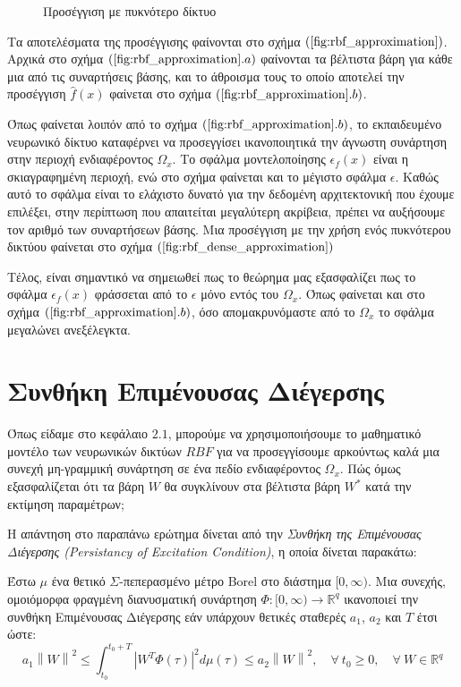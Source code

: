 {
\begin{wrapfigure}{r}{0.4\textwidth}
	\centering
	
	\caption{Προσέγγιση με πυκνότερο δίκτυο}
	\label{fig:rbf_dense_approximation}	
\end{wrapfigure}

Τα αποτελέσματα της προσέγγισης φαίνονται στο σχήμα $(\ref{fig:rbf_approximation})$. Αρχικά στο σχήμα $(\ref{fig:rbf_approximation}.a)$ φαίνονται τα βέλτιστα βάρη για κάθε μια από τις συναρτήσεις βάσης, και το άθροισμα τους το οποίο αποτελεί την προσέγγιση $\hat{f}(x)$ φαίνεται στο σχήμα $(\ref{fig:rbf_approximation}.b)$. 

Όπως φαίνεται λοιπόν από το σχήμα $(\ref{fig:rbf_approximation}.b)$, το εκπαιδευμένο νευρωνικό δίκτυο καταφέρνει να προσεγγίσει ικανοποιητικά την άγνωστη συνάρτηση στην περιοχή ενδιαφέροντος $\Omega_x$. Το σφάλμα μοντελοποίησης $\epsilon_f(x)$ είναι η σκιαγραφημένη περιοχή, ενώ στο σχήμα φαίνεται και το μέγιστο σφάλμα $\epsilon$. Καθώς αυτό το σφάλμα είναι το ελάχιστο δυνατό για την δεδομένη αρχιτεκτονική που έχουμε επιλέξει, στην περίπτωση που απαιτείται μεγαλύτερη ακρίβεια, πρέπει να αυξήσουμε τον αριθμό των συναρτήσεων βάσης. Μια προσέγγιση με την χρήση ενός πυκνότερου δικτύου φαίνεται στο σχήμα $(\ref{fig:rbf_dense_approximation})$

}

Τέλος, είναι σημαντικό να σημειωθεί πως το θεώρημα μας εξασφαλίζει πως το σφάλμα $\epsilon_f(x)$ φράσσεται από το $\epsilon$ μόνο εντός του $\Omega_x$. Όπως φαίνεται και στο σχήμα $(\ref{fig:rbf_approximation}.b)$, όσο απομακρυνόμαστε από το $\Omega_x$ το σφάλμα μεγαλώνει ανεξέλεγκτα.


\section{Συνθήκη Επιμένουσας Διέγερσης}
Όπως είδαμε στο κεφάλαιο $2.1$, μπορούμε να χρησιμοποιήσουμε το μαθηματικό μοντέλο των νευρωνικών δικτύων $RBF$ για να προσεγγίσουμε αρκούντως καλά μια συνεχή μη-γραμμική συνάρτηση σε ένα πεδίο ενδιαφέροντος $\Omega_x$. Πώς όμως εξασφαλίζεται ότι τα βάρη $W$ θα συγκλίνουν στα βέλτιστα βάρη $W^*$ κατά την εκτίμηση παραμέτρων;

Η απάντηση στο παραπάνω ερώτημα δίνεται από την \textit{Συνθήκη της Επιμένουσας Διέγερσης (Persistancy of Excitation Condition)}, η οποία δίνεται παρακάτω:\\

\begin{definition}
	Έστω $\mu$ ένα θετικό $\Sigma$-πεπερασμένο μέτρο Borel στο διάστημα $[0,\infty)$. Μια συνεχής, ομοιόμορφα φραγμένη διανυσματική συνάρτηση $\varPhi: [0,\infty) \rightarrow \mathbb{R}^q$ ικανοποιεί την συνθήκη Επιμένουσας Διέγερσης εάν υπάρχουν θετικές σταθερές $a_1$, $a_2$ και $T$ έτσι ώστε:
	\begin{equation}
	a_1 \left\| W \right\|^2 
	\leq
	\int_{t_0}^{t_0 + T} \left| W^T \varPhi(\tau) \right|^2 d\mu(\tau) 
	\leq
	a_2 \left\| W \right\|^2, \quad
	\forall \: t_0 \geq 0 , \quad
	\forall \: W \in \mathbb{R}^q
	\label{eq:pe_condition}
	\end{equation}
\end{definition}

